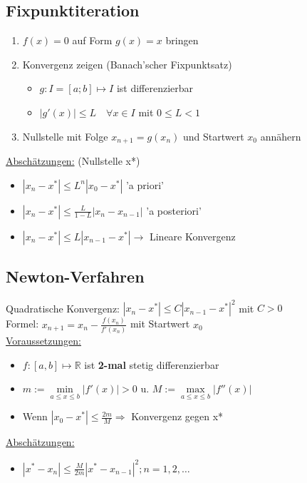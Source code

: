 \documentclass[6pt,a4paper]{scrartcl}
\newcommand{\abs}[1]{\ensuremath{\left\vert#1\right\vert}} 										%
\newcommand{\ra}[0]{\ensuremath{\rightarrow}} 									%
\newcommand{\R}{\ensuremath{\mathbb R}}
\begin{document}
\begin{multicols}{4}
\subsection{Fixpunktiteration}
\begin{enumerate}
	\item $f(x) = 0$ auf Form $g(x) = x$ bringen
	\item Konvergenz zeigen (Banach'scher Fixpunktsatz)
	\begin{itemize}\itemsep-1pt
		\item $g : I = [a;b] \mapsto I$ ist differenzierbar
		\item $\abs{g'(x)} \leq L \quad\forall x \in I$ mit $ 0 \leq L < 1$
	\end{itemize}
	\item Nullstelle mit Folge $x_{n+1} = g(x_n)$ und Startwert $x_0$ annähern
\end{enumerate}
\underline{Abschätzungen:} (Nullstelle x*)
\begin{itemize}\itemsep-1pt
	\item $\abs{x_n - x^*} \leq L^n\abs{x_0 - x^*}$ 'a priori'
	\item $\abs{x_n - x^*} \leq \frac{L}{1 - L}\abs{x_n - x_{n-1}}$ 'a posteriori'
	\item $\abs{x_n - x^*} \leq L\abs{x_{n-1} - x^*} \ra$ Lineare Konvergenz
\end{itemize}
\subsection{Newton-Verfahren}
Quadratische Konvergenz: $\abs{x_n - x^*} \leq C\abs{x_{n-1} - x^*}^2$ mit $C > 0$\\
Formel: $\boxed{x_{n+1} = x_n - \frac{f(x_n)}{f'(x_n)}}$ mit Startwert $x_0$\\
\underline{Voraussetzungen:}
\begin{itemize}\itemsep-1pt
	\item $f:[a,b] \mapsto \R$ ist \textbf{2-mal} stetig differenzierbar
	\item $m := \min\limits_{a \leq x \leq b}{\abs{f'(x)}} > 0$ u. $M := \max\limits_{a \leq x \leq b}{\abs{f''(x)}}$
	\item Wenn $\abs{x_0 - x^*} \leq \frac{2m}{M} \Rightarrow$ Konvergenz gegen x*
\end{itemize}
\underline{Abschätzungen:}
\begin{itemize}\itemsep-1pt
	\item $\abs{x^* - x_n} \leq \frac{M}{2m}\abs{x^* - x_{n-1}}^2; n = 1, 2, \ldots$
\end{itemize}




\end{multicols}
\end{document}
